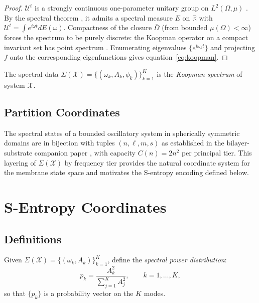 \documentclass[11pt,twocolumn,a4paper]{article}
\theoremstyle{definition}
\theoremstyle{remark}
\begin{document}
\begin{proof}
$\mathcal{U}^t$ is a strongly continuous one-parameter unitary group on
$L^2(\Omega, \mu)$ \citep{koopman1931}. By the spectral theorem \citep{vonneumann1932},
it admits a spectral measure $E$ on $\mathbb{R}$ with $\mathcal{U}^t = \int e^{i\omega t}
dE(\omega)$. Compactness of the closure $\bar{\Omega}$ (from bounded $\mu(\Omega) < \infty$)
forces the spectrum to be purely discrete: the Koopman operator on a compact
invariant set has point spectrum \citep{halmos1956}. Enumerating eigenvalues
$\{e^{i\omega_k t}\}$ and projecting $f$ onto the corresponding eigenfunctions
gives equation~\eqref{eq:koopman}.
\end{proof}

The spectral data $\Sigma(\mathcal{X}) = \{(\omega_k, A_k, \phi_k)\}_{k=1}^K$
is the \emph{Koopman spectrum} of system $\mathcal{X}$.

\subsection{Partition Coordinates}

The spectral states of a bounded oscillatory system in spherically symmetric
domains are in bijection with tuples $(n, \ell, m, s)$ as established in the
bilayer-substrate companion paper \citep{companion1}, with capacity
$C(n) = 2n^2$ per principal tier. This layering of $\Sigma(\mathcal{X})$
by frequency tier provides the natural coordinate system for the membrane state
space and motivates the S-entropy encoding defined below.

\section{S-Entropy Coordinates}
\label{sec:sentropy}

\subsection{Definitions}

Given $\Sigma(\mathcal{X}) = \{(\omega_k, A_k)\}_{k=1}^K$, define the
\emph{spectral power distribution}:
\begin{equation}
p_k = \frac{A_k^2}{\displaystyle\sum_{j=1}^K A_j^2}, \qquad k = 1, \ldots, K,
\label{eq:power}
\end{equation}
so that $\{p_k\}$ is a probability vector on the $K$ modes.
\end{document}
